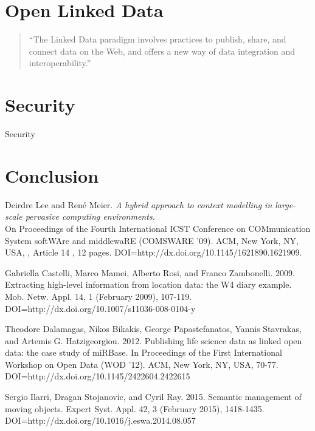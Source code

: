 \documentclass[]{report}
\begin{document}
% 
%

\section{Open Linked Data}

\begin{quote}
``The Linked Data paradigm
involves practices to publish, share, and connect data on the
Web, and offers a new way of data integration and interoperability.''\cite{3}
\end{quote}



% 
%

\section{Security}
Security


% 
%


\section{Conclusion}


% 
%

\medskip

\begin{thebibliography}{99}
Deirdre Lee and René Meier. 
\textit{ A hybrid approach to context modelling in large-scale pervasive computing environments.}\\ 
On Proceedings of the Fourth International ICST Conference on COMmunication System softWAre and middlewaRE (COMSWARE '09). ACM, New York, NY, USA, , Article 14 , 12 pages. DOI=http://dx.doi.org/10.1145/1621890.1621909.

Gabriella Castelli, Marco Mamei, Alberto Rosi, and Franco Zambonelli. 2009. Extracting high-level information from location data: the W4 diary example. Mob. Netw. Appl. 14, 1 (February 2009), 107-119. DOI=http://dx.doi.org/10.1007/s11036-008-0104-y
 
Theodore Dalamagas, Nikos Bikakis, George Papastefanatos, Yannis Stavrakas, and Artemis G. Hatzigeorgiou. 2012. Publishing life science data as linked open data: the case study of miRBase. In Proceedings of the First International Workshop on Open Data (WOD '12). ACM, New York, NY, USA, 70-77. DOI=http://dx.doi.org/10.1145/2422604.2422615
 
Sergio Ilarri, Dragan Stojanovic, and Cyril Ray. 2015. Semantic management of moving objects. Expert Syst. Appl. 42, 3 (February 2015), 1418-1435. DOI=http://dx.doi.org/10.1016/j.eswa.2014.08.057



\end{thebibliography}
\end{document}
